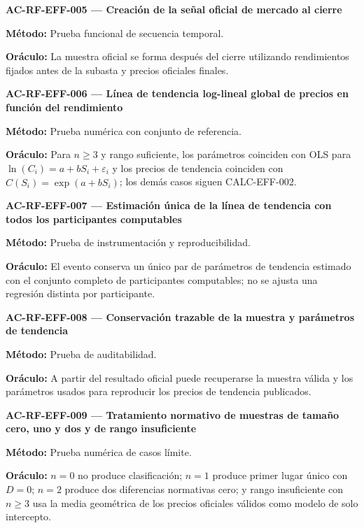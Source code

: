 \documentclass[10pt,letterpaper]{article}
\begin{document}
\noindent\textbf{AC-RF-EFF-005 --- Creación de la señal oficial de mercado al cierre}\par
\textbf{Método:} Prueba funcional de secuencia temporal.\par
\textbf{Oráculo:} La muestra oficial se forma después del cierre utilizando rendimientos fijados antes de la subasta y precios oficiales finales.\par\vspace{0.45em}
\noindent\textbf{AC-RF-EFF-006 --- Línea de tendencia log-lineal global de precios en función del rendimiento}\par
\textbf{Método:} Prueba numérica con conjunto de referencia.\par
\textbf{Oráculo:} Para $n\ge3$ y rango suficiente, los parámetros coinciden con OLS para $\ln(C_i)=a+bS_i+\varepsilon_i$ y los precios de tendencia coinciden con $\widehat C(S_i)=\exp(a+bS_i)$; los demás casos siguen CALC-EFF-002.\par\vspace{0.45em}
\noindent\textbf{AC-RF-EFF-007 --- Estimación única de la línea de tendencia con todos los participantes computables}\par
\textbf{Método:} Prueba de instrumentación y reproducibilidad.\par
\textbf{Oráculo:} El evento conserva un único par de parámetros de tendencia estimado con el conjunto completo de participantes computables; no se ajusta una regresión distinta por participante.\par\vspace{0.45em}
\noindent\textbf{AC-RF-EFF-008 --- Conservación trazable de la muestra y parámetros de tendencia}\par
\textbf{Método:} Prueba de auditabilidad.\par
\textbf{Oráculo:} A partir del resultado oficial puede recuperarse la muestra válida y los parámetros usados para reproducir los precios de tendencia publicados.\par\vspace{0.45em}
\noindent\textbf{AC-RF-EFF-009 --- Tratamiento normativo de muestras de tamaño cero, uno y dos y de rango insuficiente}\par
\textbf{Método:} Prueba numérica de casos límite.\par
\textbf{Oráculo:} $n=0$ no produce clasificación; $n=1$ produce primer lugar único con $D=0$; $n=2$ produce dos diferencias normativas cero; y rango insuficiente con $n\ge3$ usa la media geométrica de los precios oficiales válidos como modelo de solo intercepto.\par\vspace{0.45em}
\end{document}

